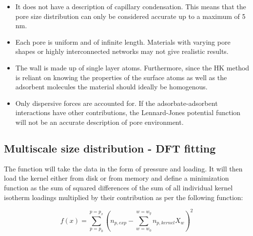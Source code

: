 \begin{itemize}
    
    \item It does not have a description of capillary condensation. This means that the
    pore size distribution can only be considered accurate up to a maximum of 5 nm.
    \item Each pore is uniform and of infinite length. Materials with varying pore
    shapes or highly interconnected networks may not give realistic results.
    \item The wall is made up of single layer atoms. Furthermore, since the HK method
    is reliant on knowing the properties of the surface atoms as well as the
    adsorbent molecules the material should ideally be homogenous.
    \item Only dispersive forces are accounted for. If the adsorbate-adsorbent interactions
    have other contributions, the Lennard-Jones potential function will not be
    an accurate description of pore environment.
    
\end{itemize}

\subsection{Multiscale size distribution - DFT fitting}

The function will take the data in the form of pressure and loading. It will
then load the kernel either from disk or from memory and define a minimization
function as the sum of squared differences of the sum of all individual kernel
isotherm loadings multiplied by their contribution as per the following function:

\begin{equation}
    f(x) = \sum_{p=p_0}^{p=p_x} (n_{p,exp} - \sum_{w=w_0}^{w=w_y} n_{p, kernel} X_w )^2
\end{equation}